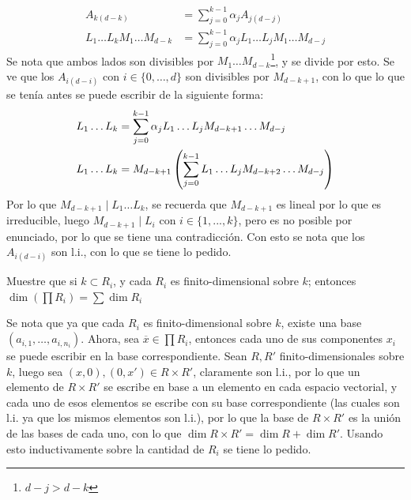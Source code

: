 \begin{sol}{2.35}
\begin{enumerate}
\begin{align*}
                  A_{k(d-k)}                   & =\sum_{j=0}^{k-1}\alpha_jA_{j(d-j)}                    \\
                  L_1\dots L_kM_1\dots M_{d-k} & = \sum_{j=0}^{k-1}\alpha_jL_1\dots L_jM_1\dots M_{d-j}
              \end{align*}
              Se nota que ambos lados son divisibles por \(M_1\dots M_{d-k}\)\footnote{\(d-j>d-k\)}, y se divide por esto. Se ve que los \(A_{i(d-i)}\) con \(i\in\{0,\dots ,d\}\) son divisibles por \(M_{d-k+1}\), con lo que lo que se tenía antes se puede escribir de la siguiente forma:
              \begin{align*}
                  L_1\dots L_k & = \sum_{j=0}^{k-1}\alpha_jL_1\dots L_jM_{d-k+1}\dots M_{d-j}          \\
                  L_1\dots L_k & = M_{d-k+1}\left(\sum_{j=0}^{k-1}L_1\dots L_jM_{d-k+2}\dots M_{d-j}\right)
              \end{align*}
              Por lo que \(M_{d-k+1}\mid L_1\dots L_k\), se recuerda que \(M_{d-k+1}\) es lineal por lo que es irreducible, luego \(M_{d-k+1}\mid L_i\) con \(i\in\{1,...,k\}\), pero es no posible por enunciado, por lo que se tiene una contradicción. Con esto se nota que los \(A_{i(d-i)}\) son l.i., con lo que se tiene lo pedido.
    \end{enumerate}
\end{sol}

\begin{prob}{2.38}
    Muestre que si \(k\subset R_i\), y cada \(R_i\) es finito-dimensional sobre \(k\); entonces \(\dim(\prod R_i)=\sum\dim R_i\)
\end{prob}

\begin{sol}{2.38}
    Se nota que ya que cada \(R_i\) es finito-dimensional sobre \(k\), existe una base \((a_{i,1},\dots ,a_{i,n_i})\). Ahora, sea \(\overline{x}\in\prod R_i\), entonces cada uno de sus componentes \(x_i\) se puede escribir en la base correspondiente. Sean \(R,R'\) finito-dimensionales sobre \(k\), luego sea \((x,0),(0,x')\in R\times R'\), claramente son l.i., por lo que un elemento de \(R\times R'\) se escribe en base a un elemento en cada espacio vectorial, y cada uno de esos elementos se escribe con su base correspondiente (las cuales son l.i. ya que los mismos elementos son l.i.), por lo que la base de \(R\times R'\) es la unión de las bases de cada uno, con lo que \(\dim R\times R'=\dim R+\dim R'\). Usando esto inductivamente sobre la cantidad de \(R_i\) se tiene lo pedido.
\end{sol}


